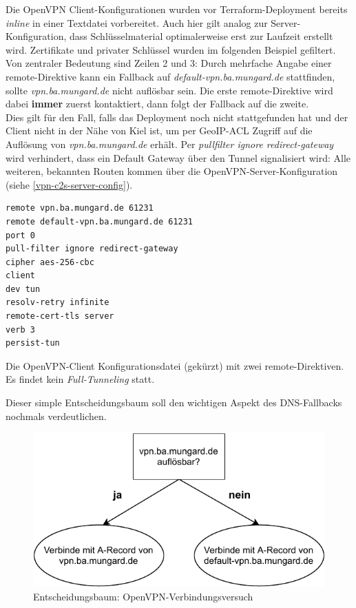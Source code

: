 Die OpenVPN Client-Konfigurationen wurden vor Terraform-Deployment bereits \textit{inline} in einer Textdatei vorbereitet. Auch hier gilt analog zur Server-Konfiguration, dass Schlüsselmaterial optimalerweise erst zur Laufzeit erstellt wird. Zertifikate und privater Schlüssel wurden im folgenden Beispiel gefiltert. Von zentraler Bedeutung sind Zeilen 2 und 3: Durch mehrfache Angabe einer remote-Direktive kann ein Fallback auf \textit{default-vpn.ba.mungard.de} stattfinden, sollte \textit{vpn.ba.mungard.de} nicht auflösbar sein. Die erste remote-Direktive wird dabei \textbf{immer} zuerst kontaktiert, dann folgt der Fallback auf die zweite.\\
Dies gilt für den Fall, falls das Deployment noch nicht stattgefunden hat und der Client nicht in der Nähe von Kiel ist, um per GeoIP-ACL Zugriff auf die Auflösung von \textit{vpn.ba.mungard.de} erhält. Per \textit{pullfilter ignore redirect-gateway} wird verhindert, dass ein Default Gateway über den Tunnel signalisiert wird: Alle weiteren, bekannten Routen kommen über die OpenVPN-Server-Konfiguration (siehe \ref{vpn-c2s-server-config}).
\begin{listing}[h]
\begin{verbatim}
remote vpn.ba.mungard.de 61231
remote default-vpn.ba.mungard.de 61231
port 0
pull-filter ignore redirect-gateway
cipher aes-256-cbc
client
dev tun
resolv-retry infinite
remote-cert-tls server
verb 3
persist-tun

\end{verbatim}
\caption{Die OpenVPN-Client Konfigurationsdatei (gekürzt) mit zwei remote-Direktiven. Es findet kein \textit{Full-Tunneling} statt.}
\label{ovpn-client-conf}
\end{listing}\FloatBarrier
Dieser simple Entscheidungsbaum soll den wichtigen Aspekt des \glqq DNS-Fallbacks\grqq{} nochmals verdeutlichen.

\begin{figure}[h]
  \centering
  \includegraphics{Figures/entscheidungsbaum_openvpn_config.pdf}
  \caption{Entscheidungsbaum: OpenVPN-Verbindungsversuch}
  \label{grafik:Use-Case_2_Entscheidungsbaum_OpenVPN}
\end{figure}\FloatBarrier
\newpage
